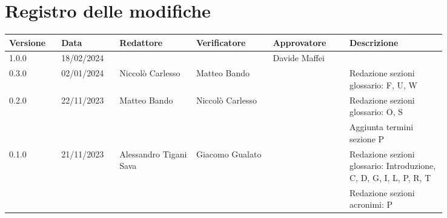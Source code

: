 \section*{Registro delle modifiche}
{
\renewcommand{\arraystretch}{1.5}
\scriptsize
\begin{longtable}{p{0.10\linewidth}p{0.10\linewidth}p{0.15\linewidth}p{0.15\linewidth}p{0.15\linewidth}p{0.19\linewidth}}
	\textbf{Versione} & \textbf{Data} & \textbf{Redattore}     & \textbf{Verificatore} & \textbf{Approvatore} & \textbf{Descrizione}	\\
	\toprule
	1.0.0	& 18/02/2024	& 						&						& Davide Maffei	& 	\\
	\hline
	0.3.0	& 02/01/2024    & Niccolò Carlesso		&	Matteo Bando		&	& Redazione sezioni glossario: F, U, W	\\
	\hline
	0.2.0	& 22/11/2023    & Matteo Bando			&	Niccolò Carlesso	&	& Redazione sezioni glossario: O, S	\\
			&               &						&						&	& Aggiunta termini sezione P		\\
	\hline
	0.1.0	& 21/11/2023    & Alessandro Tigani Sava &	Giacomo Gualato		&	& Redazione sezioni glossario: Introduzione, C, D, G, I, L, P, R, T 	\\
			&               &						&						&	& Redazione sezioni acronimi: P		\\
	\bottomrule
\end{longtable}
}
